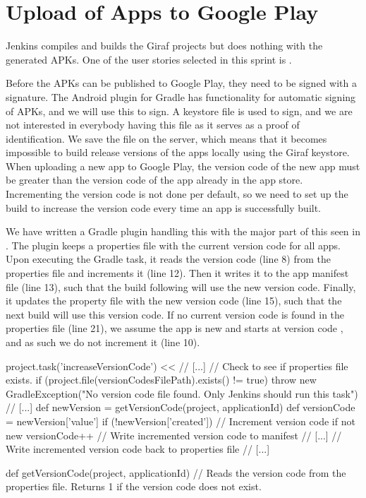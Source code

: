 \chapter{Upload of Apps to Google Play}\label{sec:upload_google_play}
Jenkins compiles and builds the Giraf projects but does nothing with the generated APKs. One of the user stories selected in this sprint is .

Before the APKs can be published to Google Play, they need to be signed with a signature. The Android plugin for Gradle has functionality for automatic signing of APKs, and we will use this to sign. A keystore file is used to sign, and we are not interested in everybody having this file as it serves as a proof of identification. We save the file on the server, which means that it becomes impossible to build release versions of the apps locally using the Giraf keystore. When uploading a new app to Google Play, the version code of the new app must be greater than the version code of the app already in the app store. Incrementing the version code is not done per default, so we need to set up the build to increase the version code every time an app is successfully built. 

We have written a Gradle plugin handling this with the major part of this seen in . The plugin keeps a properties file with the current version code for all apps. Upon executing the  Gradle task, it reads the version code (line 8) from the properties file and increments it (line 12). Then it writes it to the app manifest file (line 13), such that the build following will use the new version code. Finally, it updates the property file with the new version code (line 15), such that the next build will use this version code. If no current version code is found in the properties file (line 21), we assume the app is new and starts at version code , and as such we do not increment it (line 10).
\begin{gradlecode}[caption=Part of our Gradle plugin for updating version code,label=lst:gradle_versioncode]
project.task('increaseVersionCode') << {
    // [...]
    // Check to see if properties file exists.
    if (project.file(versionCodesFilePath).exists() != true) {
        throw new GradleException("No version code file found. Only Jenkins should run this task")
    }
    // [...]
    def newVersion = getVersionCode(project, applicationId)
    def versionCode = newVersion['value']
    if (!newVersion['created']) {
        // Increment version code if not new
        versionCode++
        // Write incremented version code to manifest
        // [...]
        // Write incremented version code back to properties file
        // [...]
    }
}

def getVersionCode(project, applicationId) {
    // Reads the version code from the properties file. Returns 1 if the version code does not exist.
}
\end{gradlecode}
 
